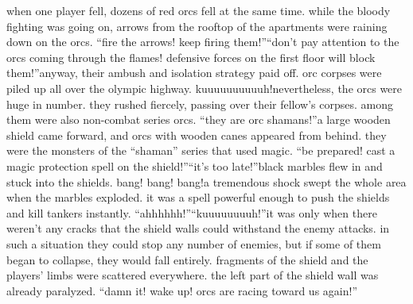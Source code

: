 when one player fell, dozens of red orcs fell at the same time.
while the bloody fighting was going on, arrows from the rooftop of the apartments were raining down on the orcs.
“fire the arrows! keep firing them!”“don’t pay attention to the orcs coming through the flames! defensive forces on the first floor will block them!”anyway, their ambush and isolation strategy paid off.
 orc corpses were piled up all over the olympic highway.
kuuuuuuuuuuh!nevertheless, the orcs were huge in number.
 they rushed fiercely, passing over their fellow’s corpses.
 among them were also non-combat series orcs.
“they are orc shamans!”a large wooden shield came forward, and orcs with wooden canes appeared from behind.
they were the monsters of the “shaman” series that used magic.
“be prepared! cast a magic protection spell on the shield!”“it’s too late!”black marbles flew in and stuck into the shields.
bang! bang! bang!a tremendous shock swept the whole area when the marbles exploded.
 it was a spell powerful enough to push the shields and kill tankers instantly.
“ahhhhhh!”“kuuuuuuuuh!”it was only when there weren’t any cracks that the shield walls could withstand the enemy attacks.
 in such a situation they could stop any number of enemies, but if some of them began to collapse, they would fall entirely.
fragments of the shield and the players’ limbs were scattered everywhere.
 the left part of the shield wall was already paralyzed.
“damn it! wake up! orcs are racing toward us again!”

 